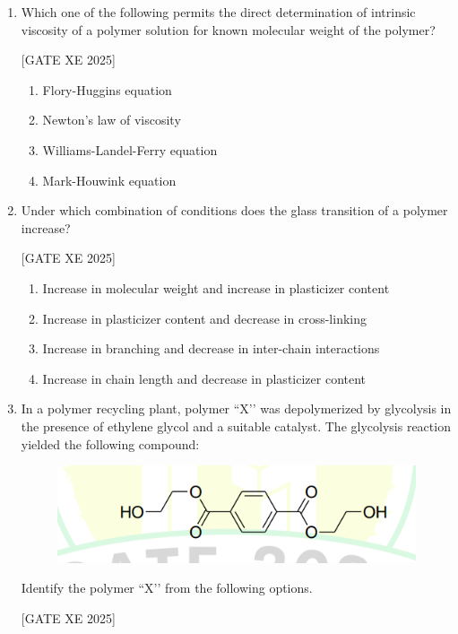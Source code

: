 \documentclass[journal,12pt,onecolumn]{IEEEtran}
\theoremstyle{remark}
\begin{document}
\begin{enumerate}
\item Which one of the following permits the direct determination of intrinsic viscosity of a polymer solution for known molecular weight of the polymer?

\hfill[GATE XE 2025]

\begin{multicols}{2}
\begin{enumerate}
\item Flory-Huggins equation
\item Newton’s law of viscosity
\item Williams-Landel-Ferry equation
\item Mark-Houwink equation
\end{enumerate}
\end{multicols}

\item Under which combination of conditions does the glass transition of a polymer increase?

\hfill[GATE XE 2025]

\begin{multicols}{2}
\begin{enumerate}
\item Increase in molecular weight and increase in plasticizer content
\item Increase in plasticizer content and decrease in cross-linking
\item Increase in branching and decrease in inter-chain interactions
\item Increase in chain length and decrease in plasticizer content
\end{enumerate}
\end{multicols}

\item In a polymer recycling plant, polymer ``X’’ was depolymerized by glycolysis in the presence of ethylene glycol and a suitable catalyst. The glycolysis reaction yielded the following compound:
\begin{figure}[H]
    \centering
    \includegraphics[width=0.5\columnwidth]{figs/fig30.png}
    \caption{}
    \label{fig:placeholder}
\end{figure}
Identify the polymer ``X’’ from the following options.

\hfill[GATE XE 2025]


\end{enumerate}
\end{document}
